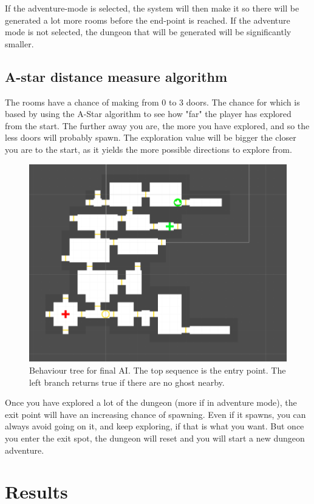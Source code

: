 \documentclass[conference,compsoc]{IEEEtran}
\begin{document}
If the adventure-mode is selected, the system will then make it so there will be generated a lot more rooms before the end-point is reached. If the adventure mode is not selected, the dungeon that will be generated will be significantly smaller. 

\subsection{A-star distance measure algorithm}
\label{sec:astar}
The rooms have a chance of making from 0 to 3 doors. The chance for which is based by using the A-Star algorithm to see how "far" the player has explored from the start. The further away you are, the more you have explored, and so the less doors will probably spawn. The exploration value will be bigger the closer you are to the start, as it yields the more possible directions to explore from.

\begin{figure}[h]
	\graphicspath{{figures/}}
	\includegraphics[width = \columnwidth ]{DungeonLayout.png}
	\caption{Behaviour tree for final AI. The top sequence is the entry point. The left branch returns true if there are no ghost nearby.}
	\label{fig:behavTree}
\end{figure}
Once you have explored a lot of the dungeon (more if in adventure mode), the exit point will have an increasing chance of spawning. Even if it spawns, you can always avoid going on it, and keep exploring, if that is what you want. But once you enter the exit spot, the dungeon will reset and you will start a new dungeon adventure.
\section{Results}
\end{document}
